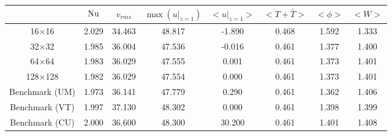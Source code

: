 \begin{tabular}{c|ccccccc}
    & $\mathrm{Nu}$ & $v_{rms}$ & $\max(u|_{z=1})$ & $<u|_{z=1}>$ & $<T + \bar{T}>$ & $<\phi>$ & $<W>$ \\
\hline
16$\times$16 & 2.029 & 34.463 & 48.817 & -1.890 & 0.468 & 1.592 & 1.333 \\
32$\times$32 & 1.985 & 36.004 & 47.536 & -0.016 & 0.461 & 1.377 & 1.400 \\
64$\times$64 & 1.983 & 36.029 & 47.555 & 0.001 & 0.461 & 1.373 & 1.401 \\
128$\times$128 & 1.982 & 36.029 & 47.554 & 0.000 & 0.461 & 1.373 & 1.401 \\
\hline
Benchmark (UM) & 1.973 & 36.141 & 47.779 & 0.290 & 0.461 & 1.362 & 1.406 \\
Benchmark (VT) & 1.997 & 37.130 & 48.302 & 0.000 & 0.461 & 1.398 & 1.399 \\
Benchmark (CU) & 2.000 & 36.600 & 48.300 & 30.200 & 0.461 & 1.401 & 1.408 \\
\end{tabular}
